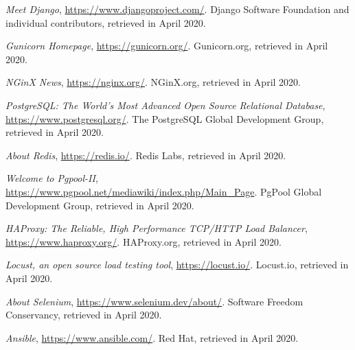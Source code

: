 \documentclass[12pt]{article}
\begin{document}
\begin{thebibliography}{9}
    \textit{Meet Django},
    \url{https://www.djangoproject.com/}.
    Django Software Foundation and individual contributors,
    retrieved in April 2020.
    \vspace{-10pt}

    \textit{Gunicorn Homepage},
    \url{https://gunicorn.org/}.
    Gunicorn.org,
    retrieved in April 2020.
    \vspace{-10pt}

    \textit{NGinX News},
    \url{https://nginx.org/}.
    NGinX.org,
    retrieved in April 2020.
    \vspace{-10pt}

    \textit{PostgreSQL: The World's Most Advanced Open Source Relational Database},
    \url{https://www.postgresql.org/}.
    The PostgreSQL Global Development Group,
    retrieved in April 2020.
    \vspace{-10pt}

    \textit{About Redis},
    \url{https://redis.io/}.
    Redis Labs,
    retrieved in April 2020.
    \vspace{-10pt}

    \textit{Welcome to Pgpool-II},
    \url{https://www.pgpool.net/mediawiki/index.php/Main_Page}.
    PgPool Global Development Group,
    retrieved in April 2020.
    \vspace{-10pt}

    \textit{HAProxy: The Reliable, High Performance TCP/HTTP Load Balancer},
    \url{https://www.haproxy.org/}.
    HAProxy.org,
    retrieved in April 2020.
    \vspace{-10pt}

  

    \textit{Locust, an open source load testing tool},
    \url{https://locust.io/}.
    Locust.io,
    retrieved in April 2020.
    \vspace{-10pt}

    \textit{About Selenium},
    \url{https://www.selenium.dev/about/}.
    Software Freedom Conservancy,
    retrieved in April 2020.
    \vspace{-10pt}

    \textit{Ansible},
    \url{https://www.ansible.com/}.
    Red Hat,
    retrieved in April 2020.
    

\end{thebibliography}

\clearpage
\end{document}
